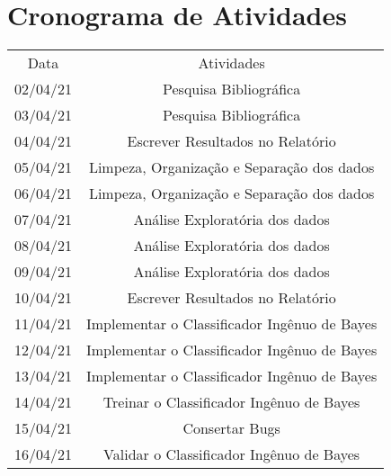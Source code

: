 \documentclass[conference]{IEEEtran}
\begin{document}
\clearpage
\section{Cronograma de Atividades}
\begin{table}[!ht]
	\centering
    \begin{small}
        \begin{tabular}{cc}
        	\\
        	\\
            \hline
            Data                    & Atividades\\
            \hline
            02/04/21                & Pesquisa Bibliográfica \\
            03/04/21                & Pesquisa Bibliográfica \\
            04/04/21                & Escrever Resultados no Relatório \\
            05/04/21                & Limpeza, Organização e Separação dos dados \\
            06/04/21                & Limpeza, Organização e Separação dos dados \\
            07/04/21                & Análise Exploratória dos dados \\
            08/04/21                & Análise Exploratória dos dados\\
            09/04/21                & Análise Exploratória dos dados\\
            10/04/21                & Escrever Resultados no Relatório\\
            11/04/21                & Implementar o Classificador Ingênuo de Bayes\\
            12/04/21                & Implementar o Classificador Ingênuo de Bayes\\
            13/04/21                & Implementar o Classificador Ingênuo de Bayes\\
            14/04/21                & Treinar o Classificador Ingênuo de Bayes\\
            15/04/21                & Consertar Bugs\\
            16/04/21                & Validar o Classificador Ingênuo de Bayes\\

\end{tabular}
\end{small}
\end{table}
\end{document}
